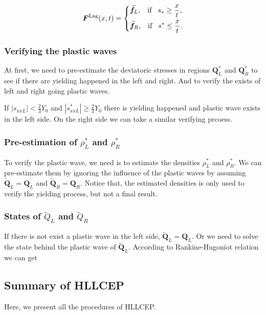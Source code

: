 \documentclass{article}
\theoremstyle{plain}\newtheorem{definition}{\sc{Definition}}
\theoremstyle{defination}\newtheorem{example}{Example}[section]
\numberwithin{equation}{section}
\numberwithin{table}{section}
\begin{document}
\begin{equation}
	\bm{F}^{\text{Lag}}(x,t) = \left\{ \begin{aligned}
		& \widetilde{\bm{f}}_L, \hspace{0.3cm} \text{if} \hspace{0.3cm} s_*\ge \frac{x}{t},\\
		& \widetilde{\bm{f}}_R, \hspace{0.3cm} \text{if} \hspace{0.3cm} s^*\le \frac{x}{t}.\\
	  \end{aligned}
	\right.
  \end{equation}

  \subsubsection{ Verifying the plastic waves}
  At first, we need to pre-estimate the deviatoric stresses in regions $\bm{Q}_L^*$ and $\bm{Q}_R^*$ to see if there are yielding happened in the left and right. And to  verify the exists of left and right going plastic waves.  
 
If $|s_{xxL}|<\frac{2}{3}Y_0$ and  $|s_{xxL}^*| \ge  \frac{2}{3}Y_0$ there is yielding happened and  plastic wave exists in the left side. On the right side we can take a similar  verifying prcoess.

\subsubsection{ Pre-estimation of  $\rho_L^*$ and  $\rho_R^*$ }
To verify the plastic wave,  we need is to estimate the densities $\rho_L^*$ and $\rho_R^*$. We can pre-estimate them by ignoring the influence of the plastic waves by assuming $\widetilde{\bm{Q}}_L = \bm{Q}_L$ and $\widetilde{\bm{Q}}_R = \bm{Q}_R$. Notice that, the estimated densities is only used  to verify  the yielding process, but not a final result.

\subsubsection{States of $\widetilde{Q}_L$ and $\widetilde{Q}_R$}
If  there is not  exist a  plastic wave in the left side, $\widetilde{\bm{Q}}_L = \bm{Q}_L$.  Or we need to solve the state behind the plastic wave of $\widetilde{\bm{Q}}_L$.  According to Rankine-Hugoniot relation we can get 

\subsection{Summary of HLLCEP}
Here, we present all the procedures of HLLCEP.
\end{document}
